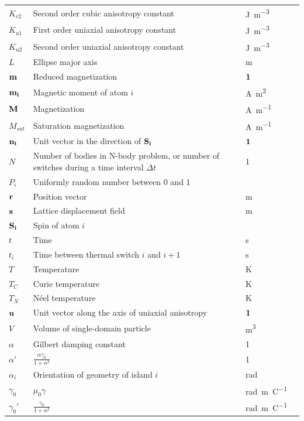 \documentclass[11pt,a4paper,english]{article}
\begin{document}
\begin{longtable}{llll}
$K_{c2}$ & Second order cubic anisotropy constant & \si{\joule\per\metre\cubed} \\
$K_{u1}$ & First order uniaxial anisotropy constant & \si{\joule\per\metre\cubed} \\
$K_{u2}$ & Second order uniaxial anisotropy constant & \si{\joule\per\metre\cubed} \\
$L$ & Ellipse major axis & \si{\metre} \\
$\vb{m}$ & Reduced magnetization & $\vb{1}$ \\
$\vb{m_i}$ & Magnetic moment of atom $i$ & \si{\ampere\metre\squared} \\
$\vb{M}$ & Magnetization & \si{\ampere\per\metre} \\
$M_{sat}$ & Saturation magnetization & \si{\ampere\per\metre} \\
$\vb{n_i}$ & Unit vector in the direction of $\vb{S_i}$ & $\vb{1}$ \\
$N$ & Number of bodies in N-body problem, or number of switches during a time interval $\Delta t$ & 1 \\ %
$P_i$ & Uniformly random number between 0 and 1 &  \\
$\vb{r}$ & Position vector & \si{\metre} \\
$\vb{s}$ & Lattice displacement field & \si{\metre} \\
$\vb{S_i}$ & Spin of atom $i$ &  \\
$t$ & Time & \si{\second} \\
$t_i$ & Time between thermal switch $i$ and $i+1$ & \si{\second} \\
$T$ & Temperature & \si{\kelvin} \\
$T_C$ & Curie temperature & \si{\kelvin} \\
$T_N$ & N\'{e}el temperature & \si{\kelvin} \\
$\vb{u}$ & Unit vector along the axis of uniaxial anisotropy & $\vb{1}$ \\
$V$ & Volume of single-domain particle & \si{\metre\cubed} \\
\midrule
$\alpha$ & Gilbert damping constant & 1 \\
$\alpha'$ & $\frac{\alpha \gamma_0}{1+\alpha^2}$ & 1 \\
$\alpha_i$ & Orientation of geometry of island $i$ & \si{\radian} \\
$\gamma_0$ & $\mu_0 \gamma$ & \si{\radian\metre\per\coulomb} \\
$\gamma_0'$ & $\frac{\gamma_0}{1+\alpha^2}$ & \si{\radian\metre\per\coulomb} \\

\end{longtable}
\end{document}
